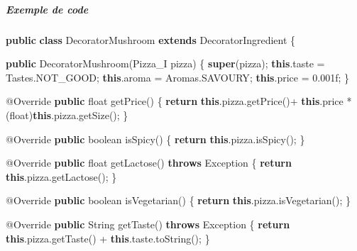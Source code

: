 \documentclass[french,]{article}
\newenvironment{Shaded}{}{}
\newcommand{\KeywordTok}[1]{\textcolor[rgb]{0.00,0.44,0.13}{\textbf{{#1}}}}
\newcommand{\DataTypeTok}[1]{\textcolor[rgb]{0.56,0.13,0.00}{{#1}}}
\newcommand{\FloatTok}[1]{\textcolor[rgb]{0.25,0.63,0.44}{{#1}}}
\newcommand{\FunctionTok}[1]{\textcolor[rgb]{0.02,0.16,0.49}{{#1}}}
\newcommand{\NormalTok}[1]{{#1}}
\let\oldsubparagraph\subparagraph
\renewcommand{\subparagraph}[1]{\oldsubparagraph{#1}\mbox{}}
\begin{document}
\subparagraph{Exemple de code}\label{exemple-de-code}

\begin{Shaded}
\begin{Highlighting}[]
\KeywordTok{public} \KeywordTok{class} \NormalTok{DecoratorMushroom }\KeywordTok{extends} \NormalTok{DecoratorIngredient \{}

\KeywordTok{public} \FunctionTok{DecoratorMushroom}\NormalTok{(Pizza_I pizza) \{}
  \KeywordTok{super}\NormalTok{(pizza);}
  \KeywordTok{this}\NormalTok{.}\FunctionTok{taste} \NormalTok{= Tastes.}\FunctionTok{NOT_GOOD}\NormalTok{;}
  \KeywordTok{this}\NormalTok{.}\FunctionTok{aroma} \NormalTok{= Aromas.}\FunctionTok{SAVOURY}\NormalTok{;}
  \KeywordTok{this}\NormalTok{.}\FunctionTok{price} \NormalTok{= }\FloatTok{0.}\NormalTok{001f;}
\NormalTok{\}}

\FunctionTok{@Override}
\KeywordTok{public} \DataTypeTok{float} \FunctionTok{getPrice}\NormalTok{() \{}
  \KeywordTok{return} \KeywordTok{this}\NormalTok{.}\FunctionTok{pizza}\NormalTok{.}\FunctionTok{getPrice}\NormalTok{()+ }\KeywordTok{this}\NormalTok{.}\FunctionTok{price} \NormalTok{* (}\DataTypeTok{float}\NormalTok{)}\KeywordTok{this}\NormalTok{.}\FunctionTok{pizza}\NormalTok{.}\FunctionTok{getSize}\NormalTok{();}
\NormalTok{\}}

\FunctionTok{@Override}
\KeywordTok{public} \DataTypeTok{boolean} \FunctionTok{isSpicy}\NormalTok{() \{}
  \KeywordTok{return} \KeywordTok{this}\NormalTok{.}\FunctionTok{pizza}\NormalTok{.}\FunctionTok{isSpicy}\NormalTok{();}
\NormalTok{\}}

\FunctionTok{@Override}
\KeywordTok{public} \DataTypeTok{float} \FunctionTok{getLactose}\NormalTok{() }\KeywordTok{throws} \NormalTok{Exception \{}
  \KeywordTok{return} \KeywordTok{this}\NormalTok{.}\FunctionTok{pizza}\NormalTok{.}\FunctionTok{getLactose}\NormalTok{();}
\NormalTok{\}}

\FunctionTok{@Override}
\KeywordTok{public} \DataTypeTok{boolean} \FunctionTok{isVegetarian}\NormalTok{() \{}
  \KeywordTok{return} \KeywordTok{this}\NormalTok{.}\FunctionTok{pizza}\NormalTok{.}\FunctionTok{isVegetarian}\NormalTok{();}
\NormalTok{\}}

\FunctionTok{@Override}
\KeywordTok{public} \NormalTok{String }\FunctionTok{getTaste}\NormalTok{() }\KeywordTok{throws} \NormalTok{Exception \{}
  \KeywordTok{return} \KeywordTok{this}\NormalTok{.}\FunctionTok{pizza}\NormalTok{.}\FunctionTok{getTaste}\NormalTok{() + }\KeywordTok{this}\NormalTok{.}\FunctionTok{taste}\NormalTok{.}\FunctionTok{toString}\NormalTok{();}
\NormalTok{\}}


\end{Highlighting}
\end{Shaded}
\end{document}
